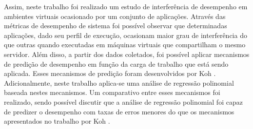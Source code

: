Assim, neste trabalho foi realizado um estudo de interferência de desempenho em
ambientes virtuais ocasionado por um conjunto de aplicações. Através das
métricas de desempenho de sistema foi possível observar que determinadas
aplicações, dado seu perfil de execução, ocasionam maior grau de interferência
do que outras quando executadas em máquinas virtuais que compartilham o mesmo
servidor. Além disso, a partir dos dados coletados, foi possível aplicar
mecanismos de predição de desempenho em função da carga de trabalho que está
sendo aplicada. Esses mecanismos de predição foram desenvolvidos por Koh
\cite{koh2007}. Adicionalmente, neste trabalho aplica-se uma análise de
regressão polinomial baseada nestes mecanismos. Um comparativo entre esses
mecanismos foi realizado, sendo possível discutir que a análise de regressão
polinomial foi capaz de predizer o desempenho com taxas de erros menores do que
os mecanismos apresentados no trabalho por Koh \cite{koh2007}.  

